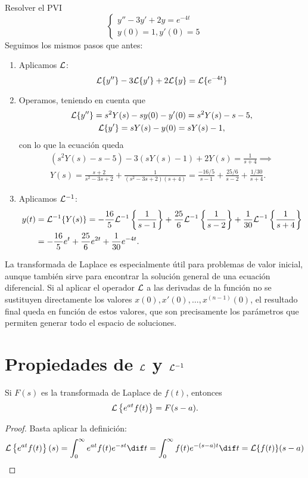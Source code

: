 \documentclass[../main.tex]{subfiles}
\begin{document}
\begin{example}
  Resolver el PVI
  \[
    \begin{cases}
      y'' - 3y' + 2y = e^{-4t} \\
      y(0) = 1, y'(0) = 5
    \end{cases}
  \]
  Seguimos los mismos pasos que antes:
  \begin{enumerate}[1)]
  \item Aplicamos \(\mathcal{L}\):
    \[\mathcal{L}\{y''\} - 3\mathcal{L}\{y'\} + 2\mathcal{L}\{y\} = \mathcal{L}\{e^{-4t}\}\]
  \item Operamos, teniendo en cuenta que
    \begin{gather*}
      \mathcal{L}\{y''\} = s^2Y(s) - sy(0) - y'(0) = s^2Y(s) - s - 5, \\
      \mathcal{L}\{y'\} = sY(s) - y(0) = sY(s) - 1,
    \end{gather*}
    con lo que la ecuación queda
    \begin{gather*}
      \left(s^2Y(s) - s - 5\right) - 3\left(sY(s) - 1\right) + 2Y(s) =
      \frac{1}{s+4} \implies \\
      Y(s) = \frac{s+2}{s^2-3s+2} + \frac{1}{(s^2-3s+2)(s+4)} =
      \frac{-16/5}{s-1} + \frac{25/6}{s-2} + \frac{1/30}{s+4}.
    \end{gather*}
  \item Aplicamos \(\mathcal{L}^{-1}\):
    \begin{align*}
      y(t) &= \mathcal{L}^{-1}\{Y(s)\} = -\frac{16}{5}\mathcal{L}^{-1}\left\{\frac{1}{s-1}\right\}
      +\frac{25}{6}\mathcal{L}^{-1}\left\{\frac{1}{s-2}\right\}
      +\frac{1}{30}\mathcal{L}^{-1}\left\{\frac{1}{s+4}\right\} \\
      &= -\frac{16}{5}e^t + \frac{25}{6}e^{2t} + \frac{1}{30}e^{-4t}.
    \end{align*}
  \end{enumerate}
\end{example}

\begin{remark}
  La transformada de Laplace es especialmente útil para problemas de valor
  inicial, aunque también sirve para encontrar la solución general de una
  ecuación diferencial. Si al aplicar el operador \(\mathcal{L}\) a las derivadas de la
  función no se sustituyen directamente los valores
  \(x(0), x'(0), \dots, x^{(n-1)}(0)\), el resultado final queda en función de
  estos valores, que son precisamente los parámetros que permiten generar todo
  el espacio de soluciones.
\end{remark}

\section{Propiedades de \(\mathcal{L}\) y \(\mathcal{L}^{-1}\)}
\begin{proposition}
  Si \(F(s)\) es la transformada de Laplace de \(f(t)\), entonces
  \[\mathcal{L}\left\{e^{at}f(t)\right\} = F(s-a).\]
  \begin{proof}
    Basta aplicar la definición:
    \[\L\left\{e^{at}f(t)\right\}(s) = \int_0^\infty e^{at}f(t) e^{-st} \dif t
      = \int_0^\infty f(t) e^{-(s-a)t} \dif t = \L\{f(t)\}(s-a)\]
  \end{proof}
\end{proposition}
\end{document}
